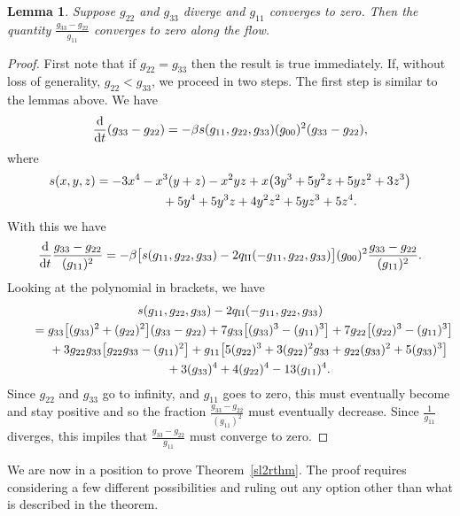 \documentclass[10pt,a4paper]{amsart}
\numberwithin{equation}{section}
\newtheorem{Lemma}[Theorem]{Lemma}
\newcommand{\dtime}{\frac{{\rm d}}{{\rm d} t}} %
\begin{document}
\begin{Lemma} \label{sl2difftozerolemma}Suppose $g_{22}$ and $g_{33}$ diverge and $g_{11}$ converges to zero. Then the quantity $\frac{g_{33} - g_{22}}{g_{11}}$ converges to zero along the flow.
\end{Lemma}

\begin{proof}First note that if $g_{22} = g_{33}$ then the result is true immediately. If, without loss of generality, $g_{22} < g_{33}$, we proceed in two steps. The first step is similar to the lemmas above. We have
\[
\dtime (g_{33} - g_{22}) = -\beta s(g_{11}, g_{22}, g_{33}) (g_{00})^2 (g_{33}-g_{22}),
\]
where
\begin{gather*}
s(x, y, z) = -3x^4 - x^3(y + z) - x^2yz + x\big(3y^3 + 5y^2z + 5yz^2 + 3z^3\big) \\
\hphantom{s(x, y, z) =}{} + 5y^4 + 5y^3z + 4y^2z^2 + 5yz^3 + 5z^4.
\end{gather*}
With this we have
\[
\dtime \frac{g_{33} - g_{22}}{(g_{11})^2}
	= - \beta \big[s(g_{11}, g_{22}, g_{33}) - 2q_{\rm II}(-g_{11}, g_{22}, g_{33}) \big]
		(g_{00})^2 \frac{g_{33} - g_{22}}{(g_{11})^2}.
\]
Looking at the polynomial in brackets, we have
\begin{gather*}
s(g_{11}, g_{22}, g_{33}) - 2q_{\rm II}(-g_{11}, g_{22}, g_{33}) \\
\qquad{}= g_{33}\big[(g_{33})^2 + (g_{22})^2\big](g_{33} - g_{22})
	 + 7g_{33}\big[(g_{33})^3 - (g_{11})^3\big] + 7g_{22}\big[(g_{22})^3 - (g_{11})^3\big] \\
\qquad\quad{} + 3g_{22} g_{33}\big[g_{22} g_{33} - (g_{11})^2\big]
	 + g_{11}\big[5(g_{22})^3 + 3(g_{22})^2 g_{33} + g_{22} (g_{33})^2 + 5 (g_{33})^3\big] \\
\qquad\quad{} + 3(g_{33})^4 + 4 (g_{22})^4 - 13 (g_{11})^4.
\end{gather*}
Since $g_{22}$ and $g_{33}$ go to infinity, and $g_{11}$ goes to zero, this must eventually become and stay positive and so the fraction $\frac{g_{33} - g_{22}}{(g_{11})^2}$ must eventually decrease. Since $\frac{1}{g_{11}}$ diverges, this impiles that $\frac{g_{33} - g_{22}}{g_{11}}$ must converge to zero.
\end{proof}

We are now in a position to prove Theorem~\ref{sl2rthm}. The proof requires considering a few different possibilities and ruling out any option other than what is described in the theorem.
\end{document}
